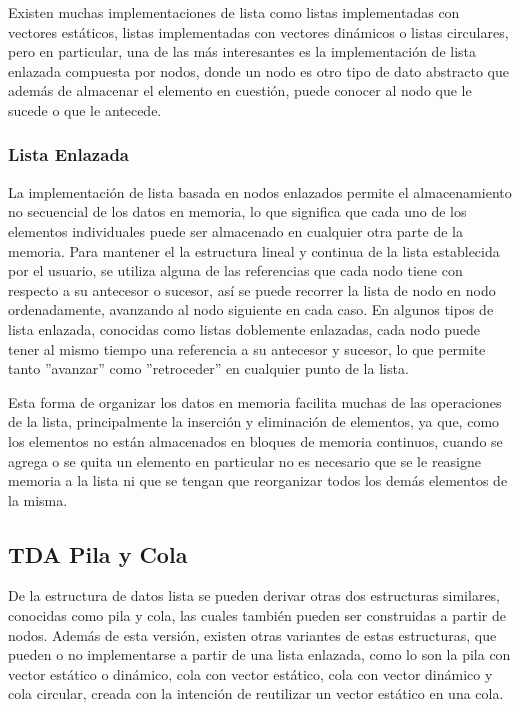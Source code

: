 \documentclass[titlepage,a4paper]{article}
\begin{document}
Existen muchas implementaciones de lista como listas implementadas con vectores estáticos, listas implementadas con vectores dinámicos o listas circulares, pero en particular, una de las más interesantes es la implementación de lista enlazada compuesta por nodos, donde un nodo es otro tipo de dato abstracto que además de almacenar el elemento en cuestión, puede conocer al nodo que le sucede o que le antecede.

\subsubsection{Lista Enlazada}

La implementación de lista basada en nodos enlazados permite el almacenamiento no secuencial de los datos en memoria, lo que significa que cada uno de los elementos individuales puede ser almacenado en cualquier otra parte de la memoria. Para mantener el la estructura lineal y continua de la lista establecida por el usuario, se utiliza alguna de las referencias que cada nodo tiene con respecto a su antecesor o sucesor, así se puede recorrer la lista de nodo en nodo ordenadamente, avanzando al nodo siguiente en cada caso. En algunos tipos de lista enlazada, conocidas como listas doblemente enlazadas, cada nodo puede tener al mismo tiempo una referencia a su antecesor y sucesor, lo que permite tanto ''avanzar'' como ''retroceder'' en cualquier punto de la lista.

Esta forma de organizar los datos en memoria facilita muchas de las operaciones de la lista, principalmente la inserción y eliminación de elementos, ya que, como los elementos no están almacenados en bloques de memoria continuos, cuando se agrega o se quita un elemento en particular no es necesario que se le reasigne memoria a la lista ni que se tengan que reorganizar todos los demás elementos de la misma.

\subsection{TDA Pila y Cola}

De la estructura de datos lista se pueden derivar otras dos estructuras similares, conocidas como pila y cola, las cuales también pueden ser construidas a partir de nodos. Además de esta versión, existen otras variantes de estas estructuras, que pueden o no implementarse a partir de una lista enlazada, como lo son la pila con vector estático o dinámico, cola con vector estático, cola con vector dinámico y cola circular, creada con la intención de reutilizar un vector estático en una cola.
\end{document}
